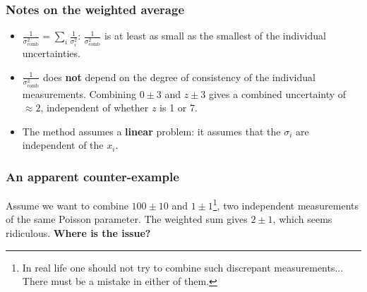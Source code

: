 \documentclass[9pt]{beamer}
\begin{document}
\begin{frame}
 \frametitle{Notes on the weighted average}
 
 \begin{itemize}
  \item $\frac{1}{\sigma^2_\text{comb}} = \sum_i \frac{1}{\sigma_i^2}$: $\frac{1}{\sigma^2_\text{comb}}$ is at least as small as the smallest of the individual uncertainties.
  \item $\frac{1}{\sigma^2_\text{comb}}$ does \textbf{not} depend on the degree of consistency of the individual measurements. Combining $0 \pm 3$ and $z \pm 3$ gives a combined
  uncertainty of $\approx 2$, independent of whether $z$ is 1 or 7.
  \item The method assumes a \textbf{linear} problem: it assumes that the $\sigma_i$ are independent of the $x_i$. 
 \end{itemize}

\end{frame}

\begin{frame}
 \frametitle{An apparent counter-example}
 
 Assume we want to combine $100 \pm 10$ and $1 \pm 1$\footnote{In real life one should not try to combine such discrepant measurements... There must be a mistake in either of them.},
 two independent measurements of the same Poisson parameter.
 The weighted sum gives $2 \pm 1$, which seems ridiculous. \textbf{Where is the issue?}
 
 
\end{frame}
\end{document}
